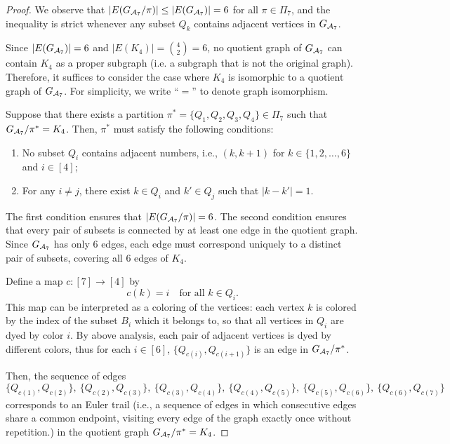 \documentclass[letterpaper,11pt]{article}
\newcommand{\partition}{\Pi}
\newcommand{\partitionp}[1]{\partition_{#1}}
\newcommand{\edges}[0]{E}
\newcommand{\edgesp}[1]{E(#1)}
\newcommand{\completegraphp}[1]{K_{#1}}
\newcommand{\graphform}[1]{G_{#1}}
\begin{document}
\begin{bibunit}[plainnat]
\begin{proof}
We observe that $|\edgesp{\graphform{\calA_7} / \pi}| \le |\edgesp{\graphform{\calA_7}}| = 6$ for all $\pi \in \partitionp{7}$, and the inequality is strict whenever any subset $Q_k$ contains adjacent vertices in $\graphform{\calA_7}$.

Since $|\edges(\graphform{\calA_7})| = 6$ and $|\edges(\completegraphp{4})| = \binom{4}{2} = 6$, no quotient graph of $\graphform{\calA_7}$ can contain $\completegraphp{4}$ as a proper subgraph (i.e. a subgraph that is not the original graph). 
Therefore, it suffices to consider the case where $\completegraphp{4}$ is isomorphic to a quotient graph of $\graphform{\calA_7}$. 
For simplicity, we write ``$=$'' to denote graph isomorphism.

Suppose that there exists a partition $\pi^{*} = \{ Q_1, Q_2, Q_3, Q_4 \} \in \Pi_7$ such that $\graphform{\calA_7} / \pi^{*} = \completegraphp{4}$. 
Then, $\pi^{*}$ must satisfy the following conditions:

\begin{enumerate}
    \item No subset $Q_i$ contains adjacent numbers, i.e., $(k, k+1)$ for $k \in \{1,2,\dots,6\}$ and $i \in [4]$;
    \item For any $i \neq j$, there exist $k \in Q_i$ and $k' \in Q_j$ such that $|k - k'| = 1$.
\end{enumerate}

The first condition ensures that $|\edgesp{\graphform{\calA_7} / \pi}| = 6$. 
The second condition ensures that every pair of subsets is connected by at least one edge in the quotient graph. 
Since $\graphform{\calA_7}$ has only $6$ edges, each edge must correspond uniquely to a distinct pair of subsets, covering all $6$ edges of $\completegraphp{4}$.

Define a map $c: [7] \to [4]$ by
\begin{equation*}
    c(k) = i \quad \text{for all } k \in Q_i.
\end{equation*}
This map can be interpreted as a coloring of the vertices: each vertex $k$ is colored by the index of the subset $B_i$ which it belongs to, so that all vertices in $Q_i$ are dyed by color $i$. By above analysis, each pair of adjacent vertices is dyed by different colors, thus for each $i \in [6]$, $ \{ Q_{c(i)}, Q_{c(i+1)} \}$ is an edge in $\graphform{\calA_7} / \pi^*$.

Then, the sequence of edges
\begin{equation*}
\{ Q_{c(1)}, Q_{c(2)} \}, \ 
\{ Q_{c(2)}, Q_{c(3)} \}, \ 
\{ Q_{c(3)}, Q_{c(4)} \}, \ 
\{ Q_{c(4)}, Q_{c(5)} \}, \ 
\{ Q_{c(5)}, Q_{c(6)} \}, \ 
\{ Q_{c(6)}, Q_{c(7)} \}
\end{equation*}
corresponds to an Euler trail (i.e., a sequence of edges in which consecutive edges share a common endpoint, visiting every edge of the graph exactly once without repetition.) in the quotient graph $\graphform{\calA_7} / \pi^* = \completegraphp{4}$.


\end{proof}
\end{bibunit}
\end{document}
